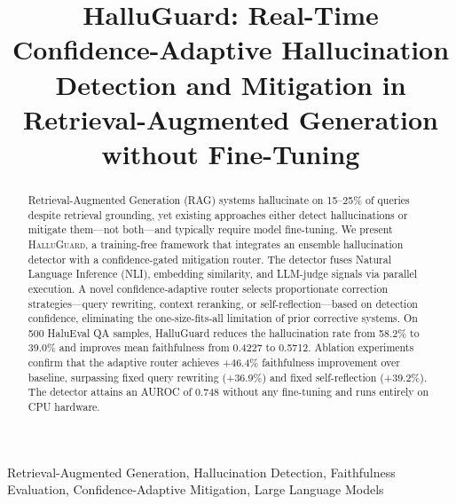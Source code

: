 \documentclass[conference]{IEEEtran}
\begin{document}
\title{HalluGuard: Real-Time Confidence-Adaptive Hallucination Detection and Mitigation in Retrieval-Augmented Generation without Fine-Tuning}

\author{
\and
{}
}

\maketitle

\begin{abstract}
Retrieval-Augmented Generation (RAG) systems hallucinate on 15--25\% of queries despite retrieval grounding, yet existing approaches either detect hallucinations or mitigate them---not both---and typically require model fine-tuning. We present \textsc{HalluGuard}, a training-free framework that integrates an ensemble hallucination detector with a confidence-gated mitigation router. The detector fuses Natural Language Inference (NLI), embedding similarity, and LLM-judge signals via parallel execution. A novel confidence-adaptive router selects proportionate correction strategies---query rewriting, context reranking, or self-reflection---based on detection confidence, eliminating the one-size-fits-all limitation of prior corrective systems. On 500 HaluEval QA samples, HalluGuard reduces the hallucination rate from 58.2\% to 39.0\% and improves mean faithfulness from 0.4227 to 0.5712. Ablation experiments confirm that the adaptive router achieves +46.4\% faithfulness improvement over baseline, surpassing fixed query rewriting (+36.9\%) and fixed self-reflection (+39.2\%). The detector attains an AUROC of 0.748 without any fine-tuning and runs entirely on CPU hardware.
\end{abstract}

\begin{IEEEkeywords}
Retrieval-Augmented Generation, Hallucination Detection, Faithfulness Evaluation, Confidence-Adaptive Mitigation, Large Language Models
\end{IEEEkeywords}
\end{document}
